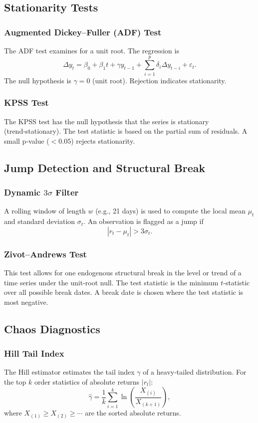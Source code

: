 \subsection{Stationarity Tests}

\subsubsection{Augmented Dickey–Fuller (ADF) Test}
The ADF test examines for a unit root. The regression is
\[
\Delta y_t = \beta_0 + \beta_1 t + \gamma y_{t-1} + \sum_{i=1}^{p} \delta_i \Delta y_{t-i} + \varepsilon_t.
\]
The null hypothesis is \(\gamma = 0\) (unit root). Rejection indicates stationarity.

\subsubsection{KPSS Test}
The KPSS test has the null hypothesis that the series is stationary (trend‑stationary). The test statistic is based on the partial sum of residuals. A small p‑value (\(<0.05\)) rejects stationarity.

\subsection{Jump Detection and Structural Break}

\subsubsection{Dynamic \(3\sigma\) Filter}
A rolling window of length \(w\) (e.g., 21 days) is used to compute the local mean \(\mu_t\) and standard deviation \(\sigma_t\). An observation is flagged as a jump if
\[
|r_t - \mu_t| > 3\sigma_t.
\]

\subsubsection{Zivot–Andrews Test}
This test allows for one endogenous structural break in the level or trend of a time series under the unit‑root null. The test statistic is the minimum \(t\)-statistic over all possible break dates. A break date is chosen where the test statistic is most negative.

\subsection{Chaos Diagnostics}

\subsubsection{Hill Tail Index}
The Hill estimator estimates the tail index \(\gamma\) of a heavy‑tailed distribution. For the top \(k\) order statistics of absolute returns \(|r_t|\):
\[
\hat{\gamma} = \frac{1}{k} \sum_{i=1}^{k} \ln\left(\frac{X_{(i)}}{X_{(k+1)}}\right),
\]
where \(X_{(1)} \ge X_{(2)} \ge \cdots\) are the sorted absolute returns.


